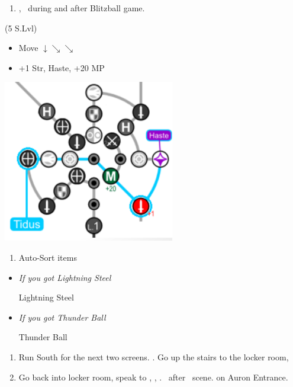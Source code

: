\begin{enumerate}[resume]
	\item \cs[2:00], \sd\ during and after Blitzball game.
\end{enumerate}
\begin{spheregrid}
	\begin{itemize}
		\tidusf (5 S.Lvl)
		\begin{itemize}
			\item Move $\downarrow \searrow\searrow$
			\item +1 Str, Haste, +20 MP
		\end{itemize}
	\end{itemize}
	\includegraphics{graphics/haste}
\end{spheregrid}
\begin{enumerate}[resume]
	\item Auto-Sort items
\end{enumerate}
\begin{equip}
	\begin{itemize}
		\item \textit{If you got Lightning Steel}
		      \begin{itemize}
			      \tidusf Lightning Steel
		      \end{itemize}
		\item \textit{If you got Thunder Ball}
		      \begin{itemize}
			      \wakkaf Thunder Ball
		      \end{itemize}
	\end{itemize}
\end{equip}
\begin{enumerate}[resume]
	\item Run South for the next two screens. \save. Go up the stairs to the locker room, \sd
	\item Go back into locker room, speak to \wakka, \sd, \cs[1:20]. \sd\ after \lulu\ scene. \cs[1:40] on Auron Entrance.
\end{enumerate}
